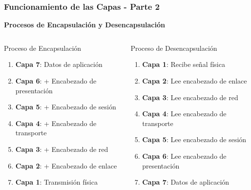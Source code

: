\documentclass[aspectratio=169]{beamer}
\begin{document}
            \begin{frame}
            \frametitle{Funcionamiento de las Capas - Parte 2}
            
            \begin{center}
            \Large \textbf{Procesos de Encapsulación y Desencapsulación}
            \end{center}
            
            \begin{columns}
            \begin{block}{Proceso de Encapsulación}
            \begin{enumerate}
            \item \textbf{Capa 7}: Datos de aplicación
            \item \textbf{Capa 6}: + Encabezado de presentación
            \item \textbf{Capa 5}: + Encabezado de sesión
            \item \textbf{Capa 4}: + Encabezado de transporte
            \item \textbf{Capa 3}: + Encabezado de red
            \item \textbf{Capa 2}: + Encabezado de enlace
            \item \textbf{Capa 1}: Transmisión física
            \end{enumerate}
            \end{block}
            
            \begin{block}{Proceso de Desencapsulación}
            \begin{enumerate}
            \item \textbf{Capa 1}: Recibe señal física
            \item \textbf{Capa 2}: Lee encabezado de enlace
            \item \textbf{Capa 3}: Lee encabezado de red
            \item \textbf{Capa 4}: Lee encabezado de transporte
            \item \textbf{Capa 5}: Lee encabezado de sesión
            \item \textbf{Capa 6}: Lee encabezado de presentación
            \item \textbf{Capa 7}: Datos de aplicación
            \end{enumerate}
            \end{block}
            \end{columns}
            \end{frame}
\end{document}
